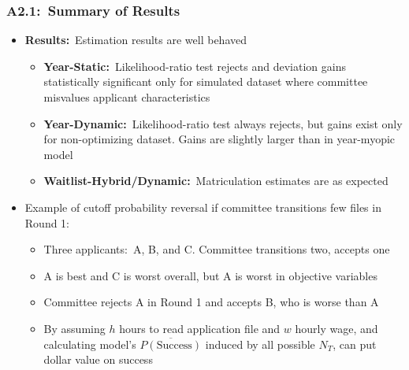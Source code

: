\documentclass[12pt, aspectratio=169]{beamer}
\begin{document}
\begin{frame}[label=sor]
\frametitle{A2.1:\ Summary of Results}
\begin{itemize}
\item \textbf{Results:}\ Estimation results are well behaved
\vspace{2.5pt}
\begin{itemize}
\item \textbf{Year-Static:}\ Likelihood-ratio test rejects and deviation gains statistically significant only for simulated dataset where committee misvalues applicant characteristics
\vspace{2.5pt}
\item \textbf{Year-Dynamic:}\ Likelihood-ratio test always rejects, but gains exist only for non-optimizing dataset. Gains are slightly larger than in year-myopic model
\vspace{2.5pt}
\item \textbf{Waitlist-Hybrid/Dynamic:}\ Matriculation estimates are as expected
\vspace{5pt}
\end{itemize}
\item Example of cutoff probability reversal if committee transitions few files in Round 1:
\vspace{2.5pt}
\begin{itemize}
\item Three applicants:\ A, B, and C. Committee transitions two, accepts one
\vspace{2.5pt}
\item A is best and C is worst overall, but A is worst in objective variables
\vspace{2.5pt}
\item Committee rejects A in Round 1 and accepts B, who is worse than A
\vspace{2.5pt}
\item By assuming $h$ hours to read application file and $w$ hourly wage, and calculating model's $\overline{P(\text{Success})}$ induced by all possible $N_T$, can put dollar value on success
\vspace{5pt}
\end{itemize}
\end{itemize}
\hyperlink{conc}{}
\end{frame}
\end{document}
